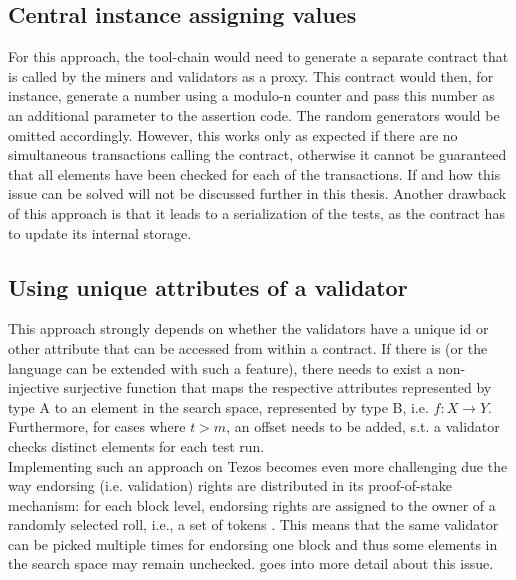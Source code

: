 \subsection{Central instance assigning values}
For this approach, the tool-chain would need to generate a separate contract that is called by the miners and validators as a proxy. This contract would then, for instance, generate a number using a modulo-n counter and pass this number as an additional parameter to the assertion code. The random generators would be omitted accordingly. However, this works only as expected if there are no simultaneous transactions calling the contract, otherwise it cannot be guaranteed that all elements have been checked for each of the transactions. If and how this issue can be solved will not be discussed further in this thesis. Another drawback of this approach is that it leads to a serialization of the tests, as the contract has to update its internal storage.

\subsection{Using unique attributes of a validator}\label{sec:alt_attributes}
This approach strongly depends on whether the validators have a unique id or other attribute that can be accessed from within a contract.  If there is (or the language can be extended with such a feature), there needs to exist a non-injective surjective function that maps the respective attributes represented by type A to an element in the search space, represented by type B, i.e. $f: X \rightarrow Y$. Furthermore, for cases where $t > m$, an offset needs to be added, s.t. a validator checks distinct elements for each test run. \\
Implementing such an approach on Tezos becomes even more challenging due the way endorsing (i.e. validation) rights are distributed in its proof-of-stake mechanism: for each block level, endorsing rights are assigned to the owner of a randomly selected roll, i.e., a set of tokens \cite{tezos_docs}. This means that the same validator can be picked multiple times for endorsing one block and thus some elements in the search space may remain unchecked. \secref{} goes into more detail about this issue. 